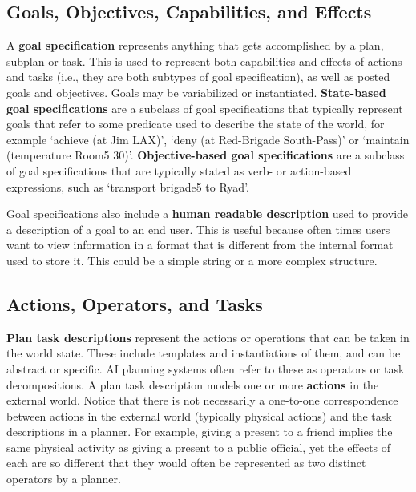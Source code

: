 \subsection{Goals, Objectives, Capabilities, and Effects}


A {\bf goal specification} represents  
anything that gets accomplished by a
plan, subplan or task.
This is used to represent both capabilities and
effects of actions and tasks
(i.e., they are both subtypes of goal specification), 
as well as posted goals and objectives.
Goals may be variabilized or instantiated.
{\bf State-based goal specifications} 
are a subclass of goal specifications that 
typically represent goals that refer
to some predicate used to describe the state of the world, for example
`achieve (at Jim LAX)', `deny (at Red-Brigade South-Pass)' or 
`maintain (temperature Room5 30)'.
{\bf Objective-based goal specifications} 
are a subclass of goal specifications that 
are typically stated as verb- or
action-based expressions, such as
`transport brigade5 to Ryad'.

Goal specifications also include a
{\bf human readable description} used to provide a description
of a goal to an end user. 
This is useful because often times users want to view information
in a format that is different from the internal format 
used to store it.  
This could be a simple string or a more complex structure.


\subsection{Actions, Operators, and Tasks}

{\bf Plan task descriptions} represent 
the actions or operations that can be taken in the world state.
These include templates and instantiations of them, 
and can be abstract or specific.
AI planning systems often refer to these as operators or task decompositions.
A plan task description models one or more {\bf actions}
in the external world.  
Notice that there is not necessarily a one-to-one correspondence between
actions in the external world (typically physical actions) and the 
task descriptions in a planner.  For example, 
giving a present to a friend implies the same physical activity
as giving a present to a public official, yet the effects of each 
are so different that they would 
often be represented as two distinct operators
by a planner.  

